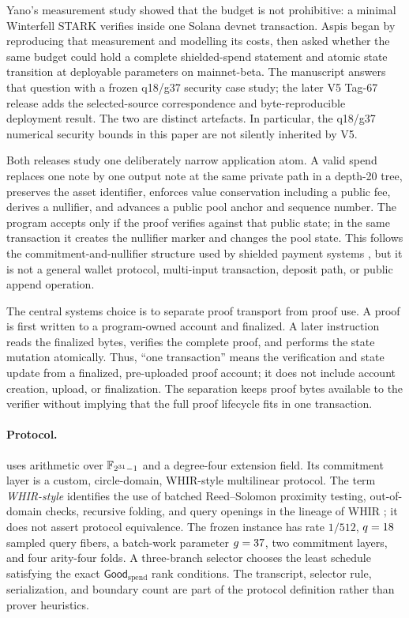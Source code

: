Yano's measurement study \cite{Yano2025Measurement} showed that the budget is
not prohibitive: a minimal Winterfell STARK verifies inside one Solana devnet
transaction.  Aspis began by reproducing that measurement and modelling its
costs, then asked whether the same budget could hold a complete shielded-spend
statement and atomic state transition at deployable parameters on
mainnet-beta.  The manuscript answers that question with a frozen q18/g37
security case study; the later V5 Tag-67 release adds the selected-source
correspondence and byte-reproducible deployment result.  The two are distinct
artefacts.  In particular, the q18/g37 numerical security bounds in this paper
are not silently inherited by V5.

Both releases study one deliberately narrow application atom.  A valid spend
replaces one note by one output note at the same private path in a depth-20
tree, preserves the asset identifier, enforces value conservation including a
public fee, derives a nullifier, and advances a public pool anchor and sequence
number.  The program accepts only if the proof verifies against that public
state; in the same transaction it creates the nullifier marker and changes the
pool state.  This follows the commitment-and-nullifier structure used by
shielded payment systems \cite{BenSassonEtAl2014Zerocash}, but it is not a
general wallet protocol, multi-input transaction, deposit path, or public
append operation.

The central systems choice is to separate proof transport from proof use.  A
proof is first written to a program-owned account and finalized.  A later
instruction reads the finalized bytes, verifies the complete proof, and
performs the state mutation atomically.  Thus, ``one transaction'' means the
verification and state update from a finalized, pre-uploaded proof account; it
does not include account creation, upload, or finalization.  The separation
keeps proof bytes available to the verifier without implying that the full
proof lifecycle fits in one transaction.

\paragraph{Protocol.}
\Profile{} uses arithmetic over $\mathbb{F}_{2^{31}-1}$ and a degree-four extension field.
Its commitment layer is a custom, circle-domain, WHIR-style multilinear
protocol.  The term \emph{WHIR-style} identifies the use of batched
Reed--Solomon proximity testing, out-of-domain checks, recursive folding, and
query openings in the lineage of WHIR
\cite{ArnonChiesaFenziYogev2025WHIR}; it does not assert
protocol equivalence.  The frozen instance has rate $1/512$,
$q=18$ sampled query fibers, a batch-work parameter
$g=37$, two commitment layers, and four arity-four folds.  A
three-branch selector chooses the least schedule satisfying the exact
\(\mathsf{Good}_{\mathrm{spend}}\) rank conditions.  The transcript, selector rule,
serialization,
and boundary count are part of the protocol definition rather than prover
heuristics.

